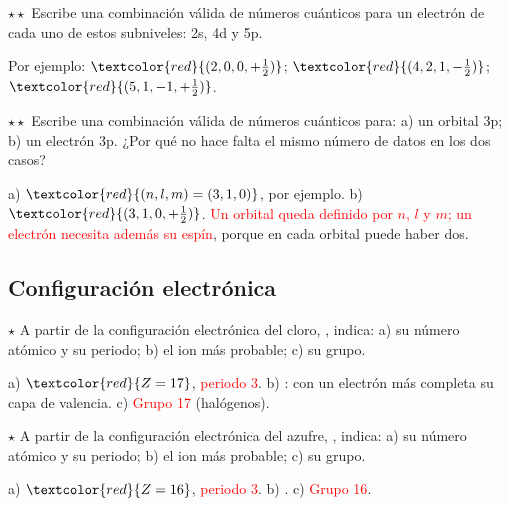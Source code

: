 \begin{exercise}
    \(\star\star\) Escribe una combinación válida de números cuánticos para un electrón de cada uno de estos subniveles: 2s, 4d y 5p.
    \begin{solu}
        Por ejemplo: \(\textcolor{red}{(2, 0, 0, +\frac{1}{2})}\); \(\textcolor{red}{(4, 2, 1, -\frac{1}{2})}\);
        \(\textcolor{red}{(5, 1, -1, +\frac{1}{2})}\).
    \end{solu}
\end{exercise}

\begin{exercise}
    \(\star\star\) Escribe una combinación válida de números cuánticos para: a) un orbital 3p; b) un electrón 3p. ¿Por qué no hace
    falta el mismo número de datos en los dos casos?
    \begin{solu}
        a) \(\textcolor{red}{(n, l, m) = (3, 1, 0)}\), por ejemplo. b) \(\textcolor{red}{(3, 1, 0, +\frac{1}{2})}\).
        \textcolor{red}{Un orbital queda definido por \(n\), \(l\) y \(m\); un electrón necesita además su espín}, porque en cada
        orbital puede haber dos.
    \end{solu}
\end{exercise}

\subsection{Configuración electrónica}

\begin{exercise}
    \(\star\) A partir de la configuración electrónica del cloro, , indica: a) su número atómico
    y su periodo; b) el ion más probable; c) su grupo.
    \begin{solu}
        a) \(\textcolor{red}{Z = 17}\), \textcolor{red}{periodo 3}. b) \textcolor{red}{}: con un electrón más completa su
        capa de valencia. c) \textcolor{red}{Grupo 17} (halógenos).
    \end{solu}
\end{exercise}

\begin{exercise}
    \(\star\) A partir de la configuración electrónica del azufre, , indica: a) su número
    atómico y su periodo; b) el ion más probable; c) su grupo.
    \begin{solu}
        a) \(\textcolor{red}{Z = 16}\), \textcolor{red}{periodo 3}. b) \textcolor{red}{}. c) \textcolor{red}{Grupo 16}.
    \end{solu}
\end{exercise}

